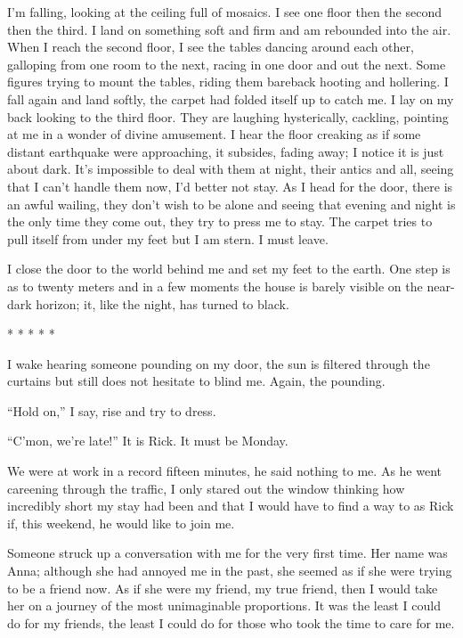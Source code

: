 \documentclass[
]{article}
\begin{document}
I'm falling, looking at the ceiling full of mosaics. I see one floor
then the second then the third. I land on something soft and firm and am
rebounded into the air. When I reach the second floor, I see the tables
dancing around each other, galloping from one room to the next, racing
in one door and out the next. Some figures trying to mount the tables,
riding them bareback hooting and hollering. I fall again and land
softly, the carpet had folded itself up to catch me. I lay on my back
looking to the third floor. They are laughing hysterically, cackling,
pointing at me in a wonder of divine amusement. I hear the floor
creaking as if some distant earthquake were approaching, it subsides,
fading away; I notice it is just about dark. It's impossible to deal
with them at night, their antics and all, seeing that I can't handle
them now, I'd better not stay. As I head for the door, there is an awful
wailing, they don't wish to be alone and seeing that evening and night
is the only time they come out, they try to press me to stay. The carpet
tries to pull itself from under my feet but I am stern. I must leave.

I close the door to the world behind me and set my feet to the earth.
One step is as to twenty meters and in a few moments the house is barely
visible on the near-dark horizon; it, like the night, has turned to
black.

* * * * *

I wake hearing someone pounding on my door, the sun is filtered through
the curtains but still does not hesitate to blind me. Again, the
pounding.

``Hold on,'' I say, rise and try to dress.

``C'mon, we're late!'' It is Rick. It must be Monday.

We were at work in a record fifteen minutes, he said nothing to me. As
he went careening through the traffic, I only stared out the window
thinking how incredibly short my stay had been and that I would have to
find a way to as Rick if, this weekend, he would like to join me.

Someone struck up a conversation with me for the very first time. Her
name was Anna; although she had annoyed me in the past, she seemed as if
she were trying to be a friend now. As if she were my friend, my true
friend, then I would take her on a journey of the most unimaginable
proportions. It was the least I could do for my friends, the least I
could do for those who took the time to care for me.
\end{document}
